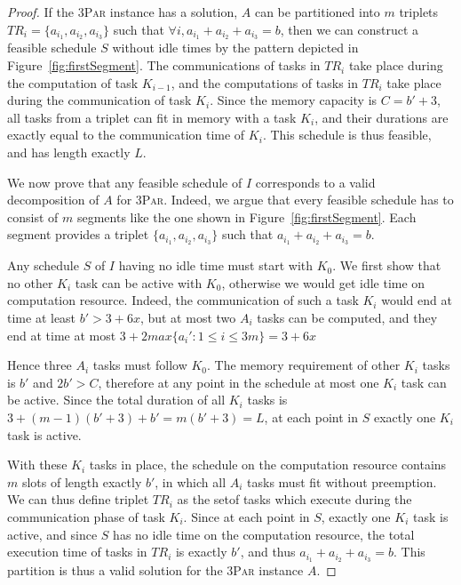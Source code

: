 \documentclass[sigconf]{acmart}
\newcommand{\threepart}{\textsc{3Par}\xspace}
\begin{document}
\begin{proof}
		
		If the \threepart instance has a solution, $A$ can be partitioned into
		$m$ triplets $TR_i = \{a_{i_1}, a_{i_2}, a_{i_3}\}$ such that $\forall
		i, a_{i_1} + a_{i_2} + a_{i_3} = b$, then we can construct a feasible
		schedule $S$ without idle times by the pattern depicted in
		Figure~\ref{fig:firstSegment}. The communications of tasks in $TR_i$ take
		place during the computation of task $K_{i-1}$, and the computations
		of tasks in $TR_i$ take place during the communication of task
		$K_i$. Since the memory capacity is $C=b'+3$, all tasks from a triplet
		can fit in memory with a task $K_i$, and their durations are exactly
		equal to the communication time of $K_i$. This schedule is thus
		feasible, and has length exactly $L$.
		
		\medskip
		
		We now prove that any feasible schedule of $I$ corresponds to a valid
		decomposition of $A$ for \threepart. Indeed, we argue that every
		feasible schedule has to consist of $m$ segments like the one shown in
		Figure~\ref{fig:firstSegment}. Each segment provides a triplet
		$\{a_{i_1}, a_{i_2}, a_{i_3}\}$ such that $a_{i_1} + a_{i_2} + a_{i_3}
		= b$.
		
		Any schedule $S$ of $I$ having no idle time must start with $K_0$. We
		first show that no other $K_i$ task can be active with $K_0$,
		otherwise we would get idle time on computation resource. Indeed, the
		communication of such a task $K_i$ would end at time at least $b'>3 +
		6x$, but at most two $A_i$ tasks can be computed, and they end at time
		at most $3+2max\{a_i':1\le i\le 3m\} = 3 + 6x$
		
		Hence three $A_i$ tasks must follow $K_0$. The memory requirement of
		other $K_i$ tasks is $b'$ and $2b'>C$, therefore at any point in the
		schedule at most one $K_i$ task can be active. Since the total
		duration of all $K_i$ tasks is $3 + (m-1)(b'+3) + b' = m (b'+3)=L$, at
		each point in $S$ exactly one $K_i$ task is active.
		
		With these $K_i$ tasks in place, the schedule on the computation
		resource contains $m$ slots of length exactly $b'$, in which all $A_i$
		tasks must fit without preemption. We can thus define triplet $TR_i$
		as the setof tasks which execute during the communication phase of
		task $K_i$. Since at each point in $S$, exactly one $K_i$ task is
		active, and since $S$ has no idle time on the computation resource,
		the total execution time of tasks in $TR_i$ is exactly $b'$, and thus
		$a_{i_1} + a_{i_2} + a_{i_3} = b$. This partition is thus a valid
		solution for the \threepart instance $A$. 
		
	\end{proof}
	
\end{document}
